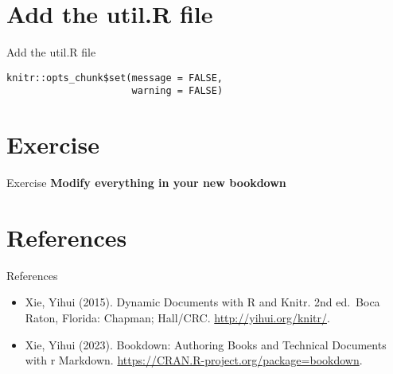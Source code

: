 \documentclass[
  ignorenonframetext,
]{beamer}
\begin{document}
\hypertarget{add-the-util.r-file}{%
\section{Add the util.R file}\label{add-the-util.r-file}}

\begin{frame}[fragile]{Add the util.R file}
\protect\hypertarget{add-the-util.r-file-1}{}
\begin{verbatim}
knitr::opts_chunk$set(message = FALSE, 
                      warning = FALSE)
\end{verbatim}
\end{frame}

\hypertarget{exercise}{%
\section{Exercise}\label{exercise}}

\begin{frame}{Exercise}
\protect\hypertarget{exercise-1}{}
\textbf{Modify everything in your new bookdown}
\end{frame}

\hypertarget{references}{%
\section{References}\label{references}}

\begin{frame}{References}
\protect\hypertarget{references-1}{}
\begin{itemize}
\item
  Xie, Yihui (2015). Dynamic Documents with R and Knitr. 2nd ed.~Boca
  Raton, Florida: Chapman; Hall/CRC. \url{http://yihui.org/knitr/}.
\item
  Xie, Yihui (2023). Bookdown: Authoring Books and Technical Documents
  with r Markdown. \url{https://CRAN.R-project.org/package=bookdown}.
\end{itemize}
\end{frame}
\end{document}
